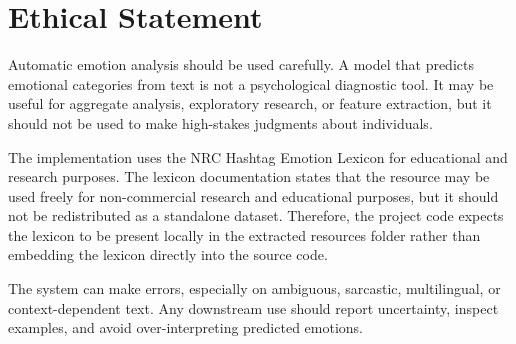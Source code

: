 \section{Ethical Statement}

Automatic emotion analysis should be used carefully. A model that predicts emotional categories from text is not a psychological diagnostic tool. It may be useful for aggregate analysis, exploratory research, or feature extraction, but it should not be used to make high-stakes judgments about individuals.

The implementation uses the NRC Hashtag Emotion Lexicon for educational and research purposes. The lexicon documentation states that the resource may be used freely for non-commercial research and educational purposes, but it should not be redistributed as a standalone dataset. Therefore, the project code expects the lexicon to be present locally in the extracted resources folder rather than embedding the lexicon directly into the source code.

The system can make errors, especially on ambiguous, sarcastic, multilingual, or context-dependent text. Any downstream use should report uncertainty, inspect examples, and avoid over-interpreting predicted emotions.
